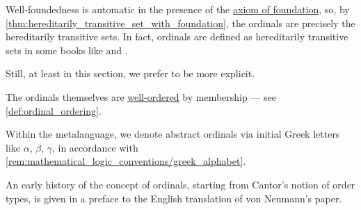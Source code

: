 \begin{comments}
  \item Well-foundedness is automatic in the presence of the \hyperref[def:zfc/foundation]{axiom of foundation}, so, by \cref{thm:hereditarily_transitive_set_with_foundation}, the ordinals are precisely the hereditarily transitive sets. In fact, ordinals are defined as hereditarily transitive sets in some books like \cite[246]{Shoenfield1967MathematicalLogic} and \cite[86]{ШеньВерещагин2020НачалаТеорииМножеств}.

  Still, at least in this section, we prefer to be more explicit.

  \item The ordinals themselves are \hyperref[def:well_ordered_set]{well-ordered} by membership --- see \cref{def:ordinal_ordering}.

  \item Within the metalanguage, we denote abstract ordinals via initial Greek letters like \( \alpha \), \( \beta \), \( \gamma \), in accordance with \cref{rem:mathematical_logic_conventions/greek_alphabet}.

  \item An early history of the concept of ordinals, starting from Cantor's notion of order types, is given in a preface to the English translation \cite{VanHeijenoort2002LogicCollection:TransfiniteNumbers} of von Neumann's paper.
\end{comments}


